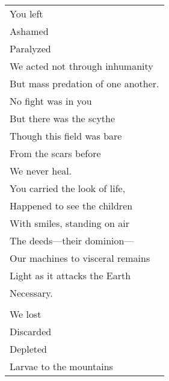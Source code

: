 \documentclass{article}
\begin{document}
\begin{center}
\begin{tabular}{l}
You left \\
Ashamed \\
Paralyzed \\
We acted not through inhumanity \\
But mass predation of one another. \\
No fight was in you \\
But there was the scythe \\
Though this field was bare \\
From the scars before \\
We never heal. \\
You carried the look of life, \\
Happened to see the children \\
With smiles, standing on air \\
The deeds---their dominion--- \\
Our machines to visceral remains \\
Light as it attacks the Earth \\
Necessary. \\
\\
We lost \\
Discarded \\
Depleted \\
Larvae to the mountains \\
\end{tabular}
\end{center}
\end{document}
